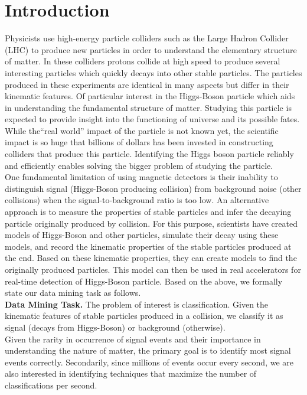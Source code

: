 \section{Introduction}
\label{sec:introduction}

Physicists use high-energy particle colliders such as the Large Hadron Collider (LHC) to produce new particles in order to understand the elementary structure of matter. In these colliders protons collide at high speed to produce several interesting particles which quickly decays into other stable particles. The particles produced in these experiments are identical in many aspects but differ in their kinematic features. Of particular interest in the Higgs-Boson particle which aids in understanding the fundamental structure of matter. Studying this particle is expected to provide insight into the functioning of universe and its possible fates. While the``real world'' impact of the particle is not known yet, the scientific impact is so huge that billions of dollars has been invested in constructing colliders that produce this particle. Identifying the Higgs boson particle reliably and efficiently enables solving the bigger problem of studying the particle. \\

One fundamental limitation of using magnetic detectors is their inability to distinguish signal (Higgs-Boson producing collision) from background noise (other collisions) when the signal-to-background ratio is too low. An alternative approach is to measure the properties of stable particles and infer the decaying particle originally produced by collision. For this purpose, scientists have created models of Higgs-Boson and other particles, simulate their decay using these models, and record the kinematic properties of the stable particles produced at the end. Based on these kinematic properties, they can create models to find the originally produced particles. This model can then be used in real accelerators for real-time detection of Higgs-Boson particle. Based on the above, we formally state our data mining task as follows.\\
\textbf{Data Mining Task.} The problem of interest is classification. Given the kinematic features of stable particles produced in a collision, we classify it as signal (decays from Higgs-Boson) or background (otherwise).\\

Given the rarity in occurrence of signal events and their importance in understanding the nature of matter, the primary goal is to identify most signal events correctly. Secondarily, since millions of events occur every second, we are also interested in identifying techniques that maximize the number of classifications per second. \\

